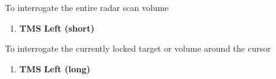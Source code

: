 \begin{checklistenumerate}
{    \smallskip
    To interrogate the entire radar scan volume

    \begin{enumerate}
        \item \textbf{TMS} \dotfill \textbf{Left (short)}
    \end{enumerate}

    To interrogate the currently locked target or volume around the cursor 

    \begin{enumerate}
        \item \textbf{TMS} \dotfill \textbf{Left (long)}
    \end{enumerate}}
\end{checklistenumerate}

\marginfigrestore
